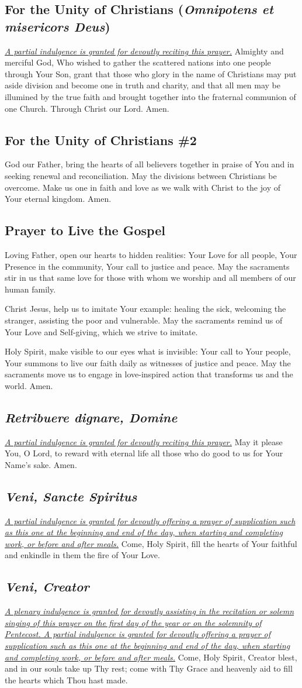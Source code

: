 \documentclass[12pt]{article}
\newcommand{\prayertitle}[1]{\subsection{#1}}
\newcommand{\indulgencedprayertitle}[1]{\prayertitle{#1 \protect\kreuz}}
\newcommand{\emphasis}[1]{\emph{#1}}
\newcommand{\emphasis}[1]{\textsl{#1}}
\newcommand{\foreign}[1]{\emphasis{#1}}
\newcommand{\note}[1]{{\small{\emphasis{#1}}}\newline}
\newcommand{\linkednote}[2]{\hyperlink{#1}{\note{#2}}}
\begin{document}
\indulgencedprayertitle{For the Unity of Christians (\foreign{Omnipotens et misericors Deus})}
\linkednote{grant11}{A partial indulgence is granted for devoutly reciting this prayer.}
Almighty and merciful God, Who wished to gather the scattered nations into one people
through Your Son, grant that those who glory in the name of Christians may put aside
division and become one in truth and charity, and that all men may be illumined by the
true faith and brought together into the fraternal communion of one Church.
Through Christ our Lord. Amen.

\prayertitle{For the Unity of Christians \#2}
God our Father, bring the hearts of all believers together in praise of You and in seeking renewal and reconciliation.
May the divisions between Christians be overcome.
Make us one in faith and love as we walk with Christ to the joy of Your eternal kingdom.
Amen.

\prayertitle{Prayer to Live the Gospel}
Loving Father, open our hearts to hidden realities:
Your Love for all people,
Your Presence in the community,
Your call to justice and peace.
May the sacraments stir in us
that same love for those with whom we worship and all members of our human family.

Christ Jesus, help us to imitate Your example:
healing the sick,
welcoming the stranger,
assisting the poor and vulnerable.
May the sacraments remind us
of Your Love and Self-giving,
which we strive to imitate.

Holy Spirit, make visible to our eyes what is invisible:
Your call to Your people,
Your summons to live our faith daily
as witnesses of justice and peace.
May the sacraments move us to engage in love-inspired action that transforms us and the world.
Amen.

\indulgencedprayertitle{\foreign{Retribuere dignare, Domine}}
\linkednote{grant24}{A partial indulgence is granted for devoutly reciting this prayer.}
May it please You, O Lord, to reward with eternal life all those who do good to us for Your Name's sake. Amen.

\indulgencedprayertitle{\foreign{Veni, Sancte Spiritus}}
\linkednote{grant26}{A partial indulgence is granted for devoutly offering a prayer of supplication such as this one at the beginning and end of the day, when starting and completing work, or before and after meals.}
Come, Holy Spirit, fill the hearts of Your faithful and enkindle in them the fire of Your Love.

\indulgencedprayertitle{\foreign{Veni, Creator}}
\linkednote{grant26}{A plenary indulgence is granted for devoutly assisting in the recitation or solemn singing of this prayer on the first day of the year or on the solemnity of Pentecost.
A partial indulgence is granted for devoutly offering a prayer of supplication such as this one at the beginning and end of the day, when starting and completing work, or before and after meals.}
Come, Holy Spirit, Creator blest,
and in our souls take up Thy rest;
come with Thy Grace and heavenly aid
to fill the hearts which Thou hast made.
\end{document}
